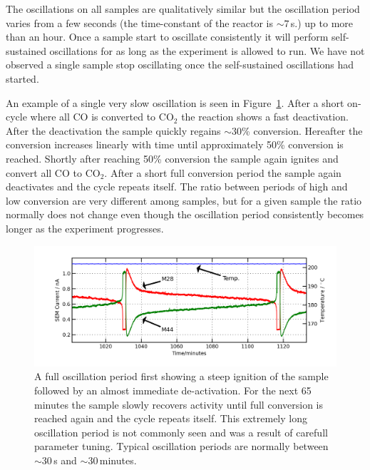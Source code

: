 \documentclass[8.5pt,twoside,twocolumn]{article}
\begin{document}
The oscillations on all samples are qualitatively similar but the oscillation period varies from a few seconds (the time-constant of the reactor is $\sim7\,$s.) up to more than an hour. Once a sample start to oscillate consistently it will perform self-sustained oscillations for as long as the experiment is allowed to run. We have not observed a single sample stop oscillating once the self-sustained oscillations had started. 

An example of a single very slow oscillation is seen in Figure~\ref{fgr:full_oscillation}. After a short on-cycle where all CO is converted to CO$_2$ the reaction shows a fast deactivation. After the deactivation the sample quickly regains $\sim$30\% conversion. Hereafter the conversion increases linearly with time until approximately 50\% conversion is reached. Shortly after reaching 50\% conversion the sample again ignites and convert all CO to CO$_2$. After a short full conversion period the sample again deactivates and the cycle repeats itself. The ratio between periods of high and low conversion are very different among samples, but for a given sample the ratio normally does not change even though the oscillation period consistently becomes longer as the experiment progresses.
\begin{figure}
  \centering
  \includegraphics[width=17cm]{single_full_oscillation.png}
  \caption{A full oscillation period first showing a steep ignition of the sample followed by an almost immediate de-activation. For the next 65 minutes the sample slowly recovers activity until full conversion is reached again and the cycle repeats itself. This extremely long oscillation period is not commonly seen and was a result of carefull parameter tuning. Typical oscillation periods are normally between $\sim$30\,s and $\sim$30\,minutes.}
  \label{fgr:full_oscillation}
\end{figure}
\end{document}
